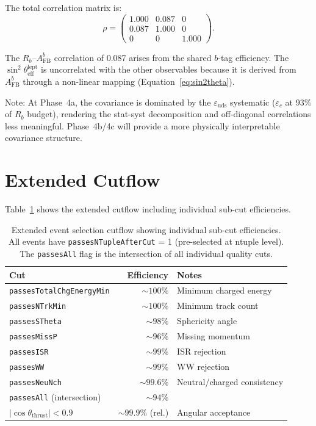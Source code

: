 \documentclass[11pt,a4paper]{article}
\begin{document}
The total correlation matrix is:
\begin{equation}
\rho = \begin{pmatrix}
1.000 & 0.087 & 0 \\
0.087 & 1.000 & 0 \\
0 & 0 & 1.000
\end{pmatrix}.
\label{eq:correlation}
\end{equation}

The $R_b$--$A_\mathrm{FB}^b$ correlation of 0.087 arises from the shared $b$-tag
efficiency. The $\sin^2\theta_\mathrm{eff}^\mathrm{lept}$ is uncorrelated with the
other observables because it is derived from $A_\mathrm{FB}^b$ through a non-linear
mapping (Equation~\ref{eq:sin2theta}).

Note: At Phase~4a, the covariance is dominated by the $\varepsilon_\mathrm{uds}$
systematic ($\varepsilon_c$ at 93\% of $R_b$ budget), rendering the stat-syst decomposition and
off-diagonal correlations less meaningful. Phase~4b/4c will provide a more
physically interpretable covariance structure.

\section{Extended Cutflow}
\label{app:cutflow}

Table~\ref{tab:extended_cutflow} shows the extended cutflow including individual
sub-cut efficiencies.

\begin{table}[htbp]
\centering
\caption{Extended event selection cutflow showing individual sub-cut efficiencies.
All events have \texttt{passesNTupleAfterCut} = 1 (pre-selected at ntuple level).
The \texttt{passesAll} flag is the intersection of all individual quality cuts.}
\label{tab:extended_cutflow}
\begin{tabular}{lrl}
\toprule
Cut & Efficiency & Notes \\
\midrule
\texttt{passesTotalChgEnergyMin} & $\sim 100\%$ & Minimum charged energy \\
\texttt{passesNTrkMin} & $\sim 100\%$ & Minimum track count \\
\texttt{passesSTheta} & $\sim 98\%$ & Sphericity angle \\
\texttt{passesMissP} & $\sim 96\%$ & Missing momentum \\
\texttt{passesISR} & $\sim 99\%$ & ISR rejection \\
\texttt{passesWW} & $\sim 99\%$ & WW rejection \\
\texttt{passesNeuNch} & $\sim 99.6\%$ & Neutral/charged consistency \\
\texttt{passesAll} (intersection) & $\sim 94\%$ & \\
$|\cos\theta_\mathrm{thrust}| < 0.9$ & $\sim 99.9\%$ (rel.) & Angular acceptance \\
\bottomrule
\end{tabular}
\end{table}
\end{document}
